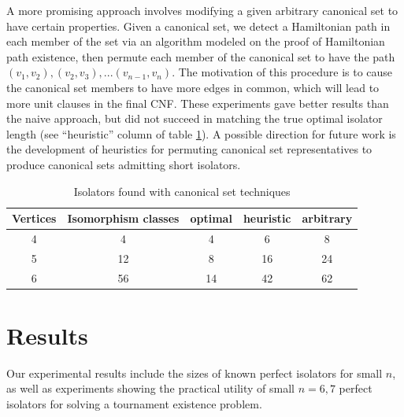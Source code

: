 \documentclass[conference]{IEEEtran}
\begin{document}
A more promising approach involves modifying a given arbitrary canonical set to have certain properties. Given a canonical set, we detect a Hamiltonian path in each member of the set via an algorithm modeled on the proof of Hamiltonian path existence, then permute each member of the canonical set to have the path $(v_1,v_2),(v_2,v_3),... (v_{n-1},v_n)$. The motivation of this procedure is to cause the canonical set members to have more edges in common, which will lead to more unit clauses in the final CNF. These experiments gave better results than the naive approach, but did not succeed in matching the true optimal isolator length (see ``heuristic'' column of  table \ref{tab:canon_set}). A possible direction for future work is the development of heuristics for permuting canonical set representatives to produce canonical sets admitting short isolators.

\begin{table}[ht]
    \centering
        \caption{Isolators found with canonical set techniques}
    \begin{tabular}{c|c|c|c|c}
        Vertices & Isomorphism classes & optimal & heuristic & arbitrary  \\ \hline
        4&4&4&6&8\\
        5&12&8&16&24\\ 
        6&56&14&42&62\\ 
    \end{tabular}

    \label{tab:canon_set}
\end{table}

\section{Results}

Our experimental results include the sizes of known perfect isolators for small $n$, as well as experiments showing the practical utility of small $n=6,7$ perfect isolators for solving a tournament existence problem.
\end{document}
